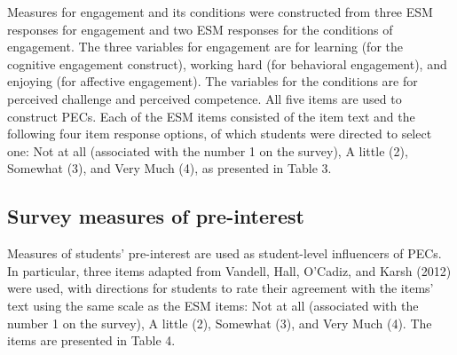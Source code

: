 \documentclass[]{book}
\theoremstyle{definition}
\theoremstyle{definition}
\theoremstyle{definition}
\theoremstyle{remark}
\begin{document}
Measures for engagement and its conditions were constructed from three
ESM responses for engagement and two ESM responses for the conditions of
engagement. The three variables for engagement are for learning (for the
cognitive engagement construct), working hard (for behavioral
engagement), and enjoying (for affective engagement). The variables for
the conditions are for perceived challenge and perceived competence. All
five items are used to construct PECs. Each of the ESM items consisted
of the item text and the following four item response options, of which
students were directed to select one: Not at all (associated with the
number 1 on the survey), A little (2), Somewhat (3), and Very Much (4),
as presented in Table 3.

\begin{table}

\caption{\label{tab:unnamed-chunk-5}ESM measures for profiles of engagement and its conditions (PECs)}
\centering
{}
\end{table}

\subsection{Survey measures of
pre-interest}\label{survey-measures-of-pre-interest}

Measures of students' pre-interest are used as student-level influencers
of PECs. In particular, three items adapted from Vandell, Hall, O'Cadiz,
and Karsh (2012) were used, with directions for students to rate their
agreement with the items' text using the same scale as the ESM items:
Not at all (associated with the number 1 on the survey), A little (2),
Somewhat (3), and Very Much (4). The items are presented in Table 4.
\end{document}
